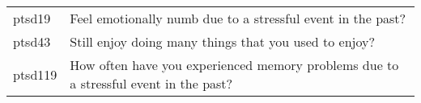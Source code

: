 \begin{tabular}{C{.25in}L{1.6in}}
  ptsd19 & Feel emotionally numb due to a stressful event in the past?\\
  ptsd43 & Still enjoy doing many things that you used to enjoy? \\
  ptsd119& How often have you experienced memory problems due to a stressful event in the past? \\
\end{tabular}                         